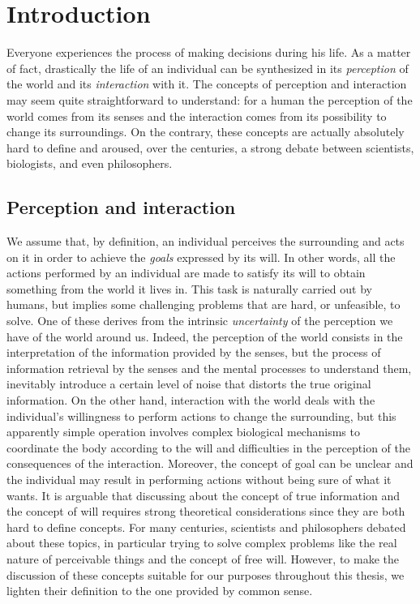 \chapter{Introduction}\label{C:intro}
Everyone experiences the process of making decisions during his life. As a matter of fact, drastically the life of an individual can be synthesized in its \textit{perception} of the world and its \textit{interaction} with it. The concepts of perception and interaction may seem quite straightforward to understand: for a human the perception of the world comes from its senses and the interaction comes from its possibility to change its surroundings. On the contrary, these concepts are actually absolutely hard to define and aroused, over the centuries, a strong debate between scientists, biologists, and even philosophers.

\section{Perception and interaction}
We assume that, by definition, an individual perceives the surrounding and acts on it in order to achieve the \textit{goals} expressed by its will. In other words, all the actions performed by an individual are made to satisfy its will to obtain something from the world it lives in. This task is naturally carried out by humans, but implies some challenging problems that are hard, or unfeasible, to solve. One of these derives from the intrinsic \textit{uncertainty} of the perception we have of the world around us. Indeed, the perception of the world consists in the interpretation of the information provided by the senses, but the process of information retrieval by the senses and the mental processes to understand them, inevitably introduce a certain level of noise that distorts the true original information. On the other hand, interaction with the world deals with the individual's willingness to perform actions to change the surrounding, but this apparently simple operation involves complex biological mechanisms to coordinate the body according to the will and difficulties in the perception of the consequences of the interaction. Moreover, the concept of goal can be unclear and the individual may result in performing actions without being sure of what it wants.
It is arguable that discussing about the concept of true information and the concept of will requires strong theoretical considerations since they are both hard to define concepts. For many centuries, scientists and philosophers debated about these topics, in particular trying to solve complex problems like the real nature of perceivable things and the concept of free will. However, to make the discussion of these concepts suitable for our purposes throughout this thesis, we lighten their definition to the one provided by common sense.

